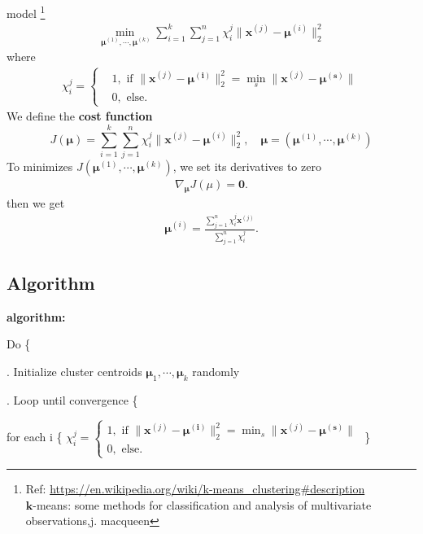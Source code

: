 \noindent model 
\footnote{
	Ref: \href{https://en.wikipedia.org/wiki/k-means_clustering\#description}{https://en.wikipedia.org/wiki/k-means\_clustering\#description}\\
	\qquad $\mathbf{k}$-means: some methods for classification and analysis of multivariate observations,j. macqueen
}
\begin{align*}
	\underset{\mathbf{\mu}^{(1)},\cdots,\mathbf{\mu}^{(k)}}{\min\,} \sum_{i=1}^{k} \sum_{j=1}^{n} \chi_i^j \|\boldsymbol x^{(j)} - \mathbf{\mu}^{(i)} \|_2^2
\end{align*}
where 
\begin{align*}
	\chi_i^j = 
	\begin{cases}
        &1, \text{ if } \|\boldsymbol x^{(j)}-\mathbf{\mu^{(i)}}\|_2^2 = \min_s \|\boldsymbol x^{(j)}-\mathbf{\mu^{(s)}}\|\\
        &0, \text{ else. }
      \end{cases}
\end{align*}
\noindent We define the \textbf{cost function}
\begin{equation*}
	J(\mathbf{\mu}) = \sum_{i=1}^{k} \sum_{j=1}^{n} \chi_i^j \|\boldsymbol x^{(j)} - \mathbf{\mu}^{(i)} \|_2^2,\quad \mathbf{\mu} = (\mathbf{\mu}^{(1)},\cdots,\mathbf{\mu}^{(k)})
\end{equation*}
\noindent To minimizes $J(\mathbf{\mu}^{(1)},\cdots,\mathbf{\mu}^{(k)})$, we set its derivatives to zero 
\begin{align*}
	\nabla_{\mathbf{\mu}} J(\mu) =  \mathbf{0} .
\end{align*}
then we get
\begin{align*}
	\mathbf{\mu}^{(i)} = \frac{\sum_{j = 1}^{n}\chi_i^j \boldsymbol x^{(j)} }{\sum_{j=1}^{n}\chi_i^j}.
\end{align*}


\subsection{Algorithm}

\noindent \textbf{algorithm:}

Do \{

. Initialize cluster centroids $\mathbf{\mu}_1,\cdots,\mathbf{\mu}_k$ randomly

. Loop until convergence \{

	\qquad for each i \{
		$\chi_i^j = 
			\begin{cases}
			1, \text{ if } \|\boldsymbol x^{(j)}-\mathbf{\mu^{(i)}}\|_2^2 = \min_s \|\boldsymbol x^{(j)}-\mathbf{\mu^{(s)}}\|\\
			0, \text{ else.}
			\end{cases}
		$
		\}

